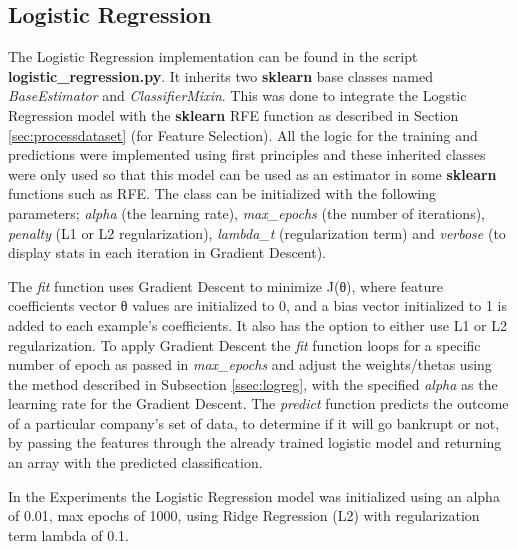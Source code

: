 \subsection{Logistic Regression}\label{ssec:impllr}
The Logistic Regression implementation can be found in the script \textbf{logistic\_regression.py}. It inherits two \textbf{sklearn} \cite{python:sklearn_api} base classes named \textit{BaseEstimator} and \textit{ClassifierMixin}. This was done to integrate the Logstic Regression model with the \textbf{sklearn} RFE function as described in Section \ref{sec:processdataset} (for Feature Selection). All the logic for the training and predictions were implemented using first principles and these inherited classes were only used so that this model can be used as an estimator in some \textbf{sklearn} functions such as RFE. The class can be initialized with the following parameters; \textit{alpha} (the learning rate), \textit{max\_epochs} (the number of iterations), \textit{penalty} (L1 or L2 regularization), \textit{lambda\_t} (regularization term) and \textit{verbose} (to display stats in each iteration in Gradient Descent).

\noindent The \textit{fit} function uses Gradient Descent to minimize J(θ), where feature coefficients vector θ values are initialized to 0, and a bias vector initialized to 1 is added to each example’s coefficients. It also has the option to either use L1 or L2 regularization. To apply Gradient Descent the \textit{fit} function loops for a specific number of epoch as passed in \textit{max\_epochs} and adjust the weights/thetas using the method described in Subsection \ref{ssec:logreg}, with the specified \textit{alpha} as the learning rate for the Gradient Descent. The \textit{predict} function predicts the outcome of a particular company’s set of data, to determine if it will go bankrupt or not, by passing the features through the already trained logistic model and returning an array with the predicted classification.

\noindent In the Experiments the Logistic Regression model was initialized using an alpha of 0.01, max epochs of 1000, using Ridge Regression (L2) with regularization term lambda of 0.1.